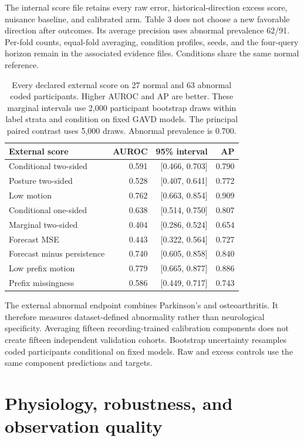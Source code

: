 \documentclass[letterpaper]{article}
\begin{document}
The internal score file retains every raw error, historical-direction excess score, nuisance baseline, and calibrated arm. Table 3 does not choose a new favorable direction after outcomes. Its average precision uses abnormal prevalence 62/91. Per-fold counts, equal-fold averaging, condition profiles, seeds, and the four-query horizon remain in the associated evidence files. Conditions share the same normal reference.

\begin{table}[t]
\centering
\footnotesize
\begin{tabular}{lrrr}
\toprule
External score & AUROC & 95\% interval & AP \\
\midrule
Conditional two-sided & 0.591 & [0.466, 0.703] & 0.790 \\
Posture two-sided & 0.528 & [0.407, 0.641] & 0.772 \\
Low motion & 0.762 & [0.663, 0.854] & 0.909 \\
Conditional one-sided & 0.638 & [0.514, 0.750] & 0.807 \\
Marginal two-sided & 0.404 & [0.286, 0.524] & 0.654 \\
Forecast MSE & 0.443 & [0.322, 0.564] & 0.727 \\
Forecast minus persistence & 0.740 & [0.605, 0.858] & 0.840 \\
Low prefix motion & 0.779 & [0.665, 0.877] & 0.886 \\
Prefix missingness & 0.586 & [0.449, 0.717] & 0.743 \\
\bottomrule
\end{tabular}
\caption{Every declared external score on 27 normal and 63 abnormal coded participants. Higher AUROC and AP are better. These marginal intervals use 2,000 participant bootstrap draws within label strata and condition on fixed GAVD models. The principal paired contrast uses 5,000 draws. Abnormal prevalence is 0.700.}
\label{tab:external_rankings}
\end{table}

The external abnormal endpoint combines Parkinson's and osteoarthritis. It therefore measures dataset-defined abnormality rather than neurological specificity. Averaging fifteen recording-trained calibration components does not create fifteen independent validation cohorts. Bootstrap uncertainty resamples coded participants conditional on fixed models. Raw and excess controls use the same component predictions and targets.

\section{Physiology, robustness, and observation quality}
\end{document}

